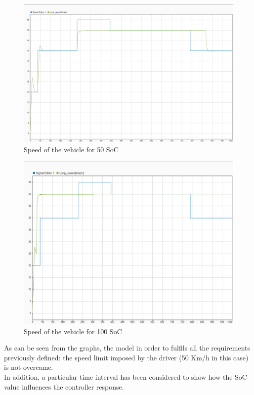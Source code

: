 \documentclass[12pt,a4paper]{report}
\begin{document}
\begin{figure}[htbp]
	\centering
	\includegraphics[scale=0.2]{50_soc.jpeg}
	\caption{Speed of the vehicle for 50 SoC}
\end{figure}

\begin{figure}[htbp]
	\centering
	\includegraphics[scale=0.2]{100_soc.jpeg}
	\caption{Speed of the vehicle for 100 SoC}
\end{figure}

As can be seen from the graphs, the model in order to fulfils all the requirements previously defined: the speed limit imposed by the driver (50 Km/h in this case) is not overcame.\\
In addition, a particular time interval has been considered to show how the SoC value influences the controller response.\\
\end{document}
